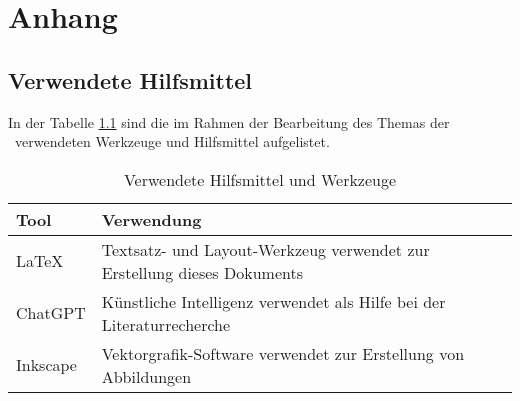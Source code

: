%

\chapter{Anhang}

\section{Verwendete Hilfsmittel}
In der Tabelle \ref{tab:tooling} sind die im Rahmen der Bearbeitung des Themas der \IthesisKindDE~verwendeten Werkzeuge und Hilfsmittel aufgelistet.

\begin{table}[h!]
\caption{Verwendete Hilfsmittel und Werkzeuge}
\begin{tabular}{|l|l|}
\hline 
\rowcolor{lightgray} Tool & Verwendung \\
\hline
\LaTeX & Textsatz- und Layout-Werkzeug verwendet zur Erstellung dieses Dokuments \\
\hline
ChatGPT & Künstliche Intelligenz verwendet als Hilfe bei der Literaturrecherche \\
\hline
Inkscape & Vektorgrafik-Software verwendet zur Erstellung von Abbildungen \\
\hline
\end{tabular}
\label{tab:tooling}
\end{table}
